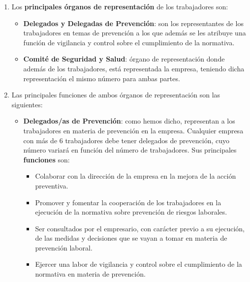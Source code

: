 \begin{enumerate}[label=\alph*.]
    \item Los \textbf{principales órganos de representación} de los trabajadores son:
    \begin{itemize}
        \item \textbf{Delegados y Delegadas de Prevención}: son los representantes de los trabajadores en temas de prevención a los que además se les atribuye una función de vigilancia y control sobre el cumplimiento de la normativa.
        \item \textbf{Comité de Seguridad y Salud}: órgano de representación donde además de los trabajadores, está representada la empresa, teniendo dicha representación el mismo número para ambas partes.
    \end{itemize}

    \item Las principales funciones de ambos órganos de representación son las siguientes:
    \begin{itemize}
        \item \textbf{Delegados/as de Prevención}: como hemos dicho, representan a los trabajadores en materia de prevención en la empresa. Cualquier empresa con más de 6 trabajadores debe tener delegados de prevención, cuyo número variará en función del número de trabajadores. Sus principales \textbf{funciones} son:
        \begin{itemize}
            \item Colaborar con la dirección de la empresa en la mejora de la acción preventiva.
            \item Promover y fomentar la cooperación de los trabajadores en la ejecución de la normativa sobre prevención de riesgos laborales.
            \item Ser consultados por el empresario, con carácter previo a su ejecución, de las medidas y decisiones que se vayan a tomar en materia de prevención laboral.
            \item Ejercer una labor de vigilancia y control sobre el cumplimiento de la normativa en materia de prevención.
        \end{itemize}


\end{itemize}
\end{enumerate}
